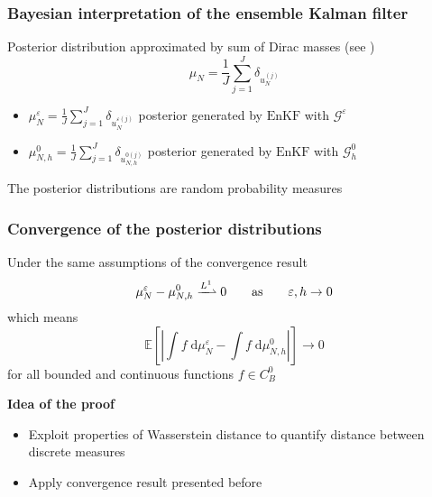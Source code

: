 \begin{frame}
\frametitle{Bayesian interpretation of the ensemble Kalman filter}
Posterior distribution approximated by sum of Dirac masses (see \cite{AEKFIP})
\[ \mu_N = \frac{1}{J} \sum_{j=1}^J \delta_{u_N^{(j)}} \]
\begin{itemize}
\item $\mu_N^{\varepsilon} = \frac{1}{J} \sum_{j=1}^J \delta_{u_N^{\varepsilon(j)}}$ posterior generated by $\mathrm{EnKF}$ with $\mathcal{G}^{\varepsilon}$
\item $\mu^0_{N,h} = \frac{1}{J} \sum_{j=1}^J \delta_{u_{N,h}^{0(j)}}$ posterior generated by $\mathrm{EnKF}$ with $\mathcal{G}^0_h$
\end{itemize}
\begin{orangeblock}[Warning]
The posterior distributions are random probability measures 
\end{orangeblock}
\end{frame}

\begin{frame}
\frametitle{Convergence of the posterior distributions}
\begin{theorem}
Under the same assumptions of the convergence result
\begin{equation*}
\mu_N^{\varepsilon} - \mu_{N,h}^0 \xrightharpoonup{L^1} 0 \qquad \text{as} \qquad \varepsilon, h \to 0
\end{equation*}
which means
\begin{equation*}
\mathbb{E} \left [ \left | \int f \; \mathrm{d} \mu_N^{\varepsilon} - \int f \; \mathrm{d} \mu_{N,h}^0 \right | \right ] \to 0
\end{equation*}
for all bounded and continuous functions $f \in C^0_B$
\end{theorem}
\textbf{Idea of the proof} \\
\begin{itemize}
\item Exploit properties of Wasserstein distance to quantify distance between discrete measures
\item Apply convergence result presented before
\end{itemize}
\end{frame}

